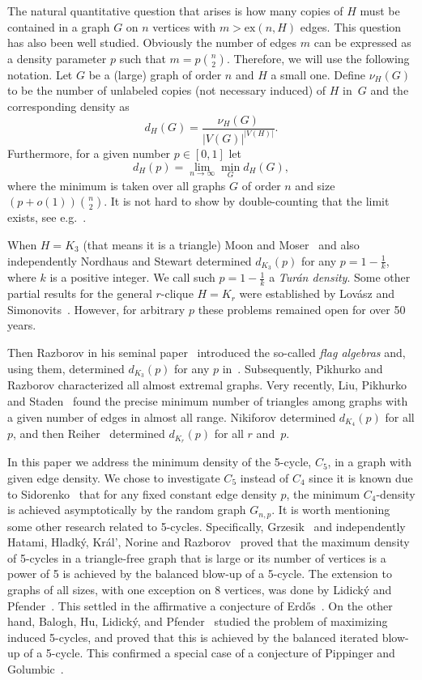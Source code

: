 \documentclass[12pt]{article}
\newcommand{\ex}{\mathrm{ex}}
\theoremstyle{definition}
\theoremstyle{remark}
\begin{document}
The natural quantitative question that arises is how many copies of $H$ must be contained in a graph $G$ on $n$ vertices with $m > \ex(n, H)$ edges. This question has also been well studied. Obviously the number of edges $m$ can be expressed as a density parameter $p$ such that $m=p\binom{n}{2}$. Therefore, we will use the following notation. Let $G$ be a (large) graph of order $n$ and  $H$ a small one. Define $\nu_H(G)$ to be the number of unlabeled copies (not necessary induced) of $H$ in~$G$
and the corresponding density as
\[
d_{H}(G) = \frac{\nu_H(G)}{|V(G)|^{|V(H)|}}.
\] 
Furthermore, for a given number $p\in[0,1]$ let
\[
d_H(p) = \lim_{n\to\infty} \min_{G} d_{H}(G),
\] 
where the minimum is taken over all graphs $G$ of order $n$ and size $(p+o(1))\binom{n}{2}$. It is not hard to show by double-counting that the limit exists, see e.g.~\cite[Lemma~2.2]{PikhurkoSliacanTyros19}.

When $H=K_3$ (that means it is a triangle) Moon and Moser~\cite{MooMos1962} and also independently Nordhaus and Stewart \cite{NorSte1963}
determined $d_{K_3}(p)$ for any $p=1-\frac{1}{k}$, where $k$ is a positive integer. We call such $p=1-\frac{1}{k}$ a \emph{Tur\'an density}. Some other partial results for the general $r$-clique $H=K_r$ were established by Lov\'asz and Simonovits~\cite{LovSim1983}. However, for arbitrary $p$ these problems remained open for over 50 years. 

Then Razborov in his seminal paper~\cite{Raz2007} introduced the so-called \emph{flag algebras} and, using them, determined $d_{K_3}(p)$ for any $p$ in~\cite{Raz2008}. Subsequently, Pikhurko and Razborov \cite{PikRaz2017} characterized all almost extremal graphs. Very recently, Liu, Pikhurko and Staden~\cite{LPR2017} found the precise minimum number of triangles among graphs with a given number of edges in almost all range. Nikiforov \cite{Nik2011} determined $d_{K_4}(p)$ for all $p$, and then Reiher~\cite{Rei2016} determined $d_{K_r}(p)$ for all $r$ and~$p$.

In this paper we address the minimum density of the 5-cycle, $C_5$, in a graph with given edge density. We chose to investigate $C_5$ instead of $C_4$ since it is known due to Sidorenko~\cite{Sid1991} that for any fixed constant edge density $p$, the minimum $C_4$-density is achieved asymptotically by the random graph $G_{n, p}$. It is worth mentioning some other research related to 5-cycles.  Specifically, Grzesik~\cite{Grz2012} and independently Hatami, Hladk\'y, Kr{\'al'}, Norine and Razborov~\cite{HatHlaKraNorRaz2013} proved that the maximum density of 5-cycles in a triangle-free graph that is large or its number of vertices is a power of 5 is achieved by the balanced blow-up of a 5-cycle. 
The extension to graphs of all sizes, with one exception on 8 vertices, was done by Lidick\'y and Pfender~\cite{LP2017}.
This settled in the affirmative a conjecture of Erd\H{o}s~\cite{Erd1984}. On the other hand, Balogh, Hu, Lidick\'y, and Pfender~\cite{BalHuLidPfe2016} studied the problem of maximizing induced 5-cycles, and proved that this is achieved by the balanced iterated blow-up of a 5-cycle. This confirmed a special case of a conjecture of Pippinger and Golumbic~\cite{PipGol1975}.
\end{document}
